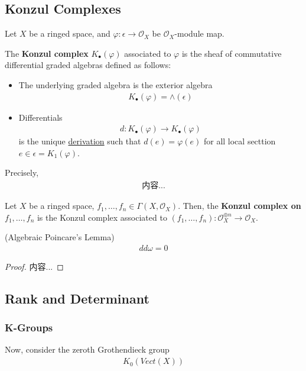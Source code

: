 \documentclass[Total.tex]{subfiles}
\begin{document}
			\subsection{Konzul Complexes}
				\begin{Def}
					Let $X$ be a ringed space, and $\varphi:\epsilon\rightarrow \mathcal{O}_X$ be $\mathcal{O}_X$-module map.
					
					The \textbf{Konzul complex} $K_\bullet(\varphi)$ associated to $\varphi$ is the sheaf of commutative differential graded algebras defined as follows:
					\begin{itemize}
						\item The underlying graded algebra is the exterior algebra
						\begin{gather*}
							K_\bullet(\varphi)=\wedge(\epsilon)
						\end{gather*}
						\item Differentials 
						\begin{gather*}
							d:K_\bullet(\varphi)\rightarrow K_\bullet(\varphi)
						\end{gather*}
						is the unique \underline{derivation} such that $d(e)=\varphi(e)$ for all local secttion $e\in \epsilon=K_1(\varphi)$.
					\end{itemize}
				\end{Def}
				Precisely,
				\begin{gather*}
					内容...
				\end{gather*}
				\begin{Def}
					Let $X$ be a ringed space, $f_1,\dots,f_n\in \Gamma(X,\mathcal{O}_X)$. Then, the \textbf{Konzul complex on} $f_1,\dots,f_n$ is the Konzul complex associated to $(f_1,\dots,f_n):\mathcal{O}_X^{\oplus n}\rightarrow \mathcal{O}_X$.
				\end{Def}
				\begin{proposition}
					(Algebraic Poincare's Lemma) \begin{gather*}
						dd\omega=0
					\end{gather*}
				\end{proposition}
				\begin{proof}
					内容...
				\end{proof}
			\subsection{Rank and Determinant}
			
				\subsubsection{K-Groups}
					Now, consider the zeroth Grothendieck group 
					\begin{gather*}
						K_0(Vect(X))
					\end{gather*}
					
\end{document}
